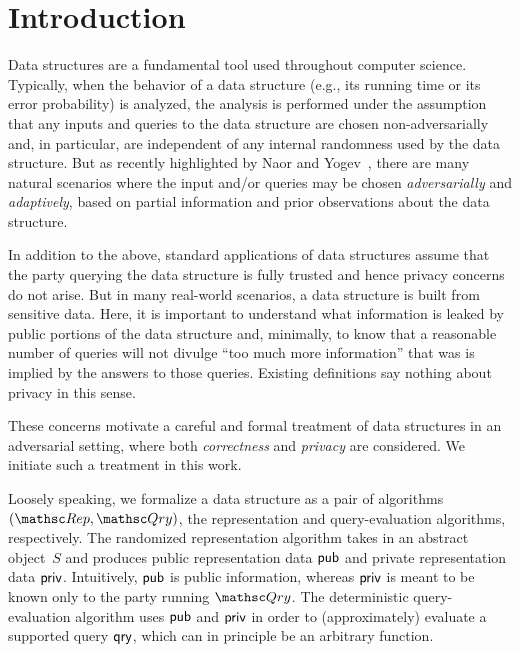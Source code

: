 \section{Introduction}
\label{sec:intro}

Data structures are a fundamental tool used throughout computer
science. Typically, when the behavior of a data structure (e.g., its
running time or its error probability) is analyzed, the analysis is
performed under the assumption that any inputs and queries to the
data structure are chosen non-adversarially and, in particular, are
independent of any internal randomness used by the data structure.
But as recently highlighted by Naor and Yogev~\cite{C:NaoYog15},
there are many natural scenarios where the input and/or queries may
be chosen \emph{adversarially} and \emph{adaptively}, based on
partial information and prior observations about the data structure.

In addition to the above, standard applications of data structures
assume that the party querying the data structure is fully trusted
and hence privacy concerns do not arise. But in many real-world
scenarios, a data structure is built from sensitive data.  Here, it
is important to understand what information is leaked by public
portions of the data structure and, minimally, to know that a
reasonable number of queries will not divulge ``too much more
information'' that was is implied by the answers to those queries.
Existing definitions say nothing about privacy in this sense.

These concerns motivate a careful and formal treatment of data
structures in an adversarial setting, where both \emph{correctness}
and \emph{privacy} are considered. We initiate such a treatment in
this work.

 Loosely speaking,
we formalize a data structure as a pair of algorithms $(\Rep,\Qry)$,
the representation and query-evaluation algorithms, respectively.
The randomized representation algorithm takes in an abstract
object~$S$ and produces public representation data ${\sf pub}$ and
private representation data ${\sf priv}$.  Intuitively, ${\sf pub}$ is
public information, whereas ${\sf priv}$ is meant to be known only to
the party running $\Qry$.  The deterministic query-evaluation
algorithm uses ${\sf pub}$ and ${\sf priv}$ in order to (approximately)
evaluate a supported query $\mathsf{qry}$, which can in principle be an
arbitrary function.

